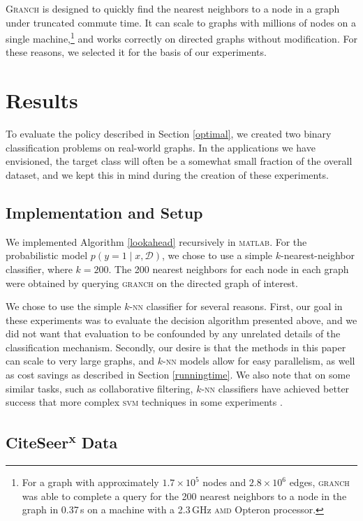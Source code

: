 \documentclass{acm_proc_article-sp}
\newcommand{\cm}[1]{\mathcal{#1}}
\newcommand{\data}{\cm{D}}
\newcommand{\given}{\mid}
\begin{document}
\textsc{Granch} is designed to quickly find the nearest neighbors to a
node in a graph under truncated commute time.  It can scale to graphs
with millions of nodes on a single machine,\footnote{For a graph with
  approximately $1.7 \times 10^5$ nodes and $2.8 \times 10^6$ edges,
  \textsc{granch} was able to complete a query for the 200 nearest
  neighbors to a node in the graph in 0.37\,s on a machine with a
  2.3\,GHz \textsc{amd} Opteron processor.} and works correctly on
directed graphs without modification.  For these reasons, we selected
it for the basis of our experiments.

\section{Results}

To evaluate the policy described in Section \ref{optimal}, we created
two binary classification problems on real-world graphs.  In the
applications we have envisioned, the target class will often be a
somewhat small fraction of the overall dataset, and we kept this in
mind during the creation of these experiments.

\subsection{Implementation and Setup}

We implemented Algorithm \ref{lookahead} recursively in
\textsc{matlab}.  For the probabilistic model $p(y = 1 \given x,
\data)$, we chose to use a simple $k$-nearest-neighbor classifier,
where $k = 200$.  The 200 nearest neighbors for each node in each
graph were obtained by querying \textsc{granch} on the directed graph
of interest.

We chose to use the simple $k$-\textsc{nn} classifier for several
reasons.  First, our goal in these experiments was to evaluate the
decision algorithm presented above, and we did not want that
evaluation to be confounded by any unrelated details of the
classification mechanism.  Secondly, our desire is that the methods in
this paper can scale to very large graphs, and $k$-\textsc{nn} models
allow for easy parallelism, as well as cost savings as described in
Section \ref{runningtime}.  We also note that on some similar tasks,
such as collaborative filtering, $k$-\textsc{nn} classifiers have
achieved better success that more complex \textsc{svm} techniques in
some experiments \citep{knnvssvm}.

\subsection{CiteSeer\textsuperscript{\textbf{x}} Data}
\end{document}
